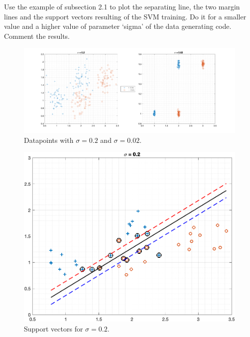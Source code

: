 \documentclass[11pt]{article}
\begin{document}
\newpage
\begin{tcolorbox}[colback=CrispBlue!5!white,colframe=CrispBlue!75!black,title=3.2 Graphical representation of an SVM.]
Use the example of subsection 2.1 to plot the separating line, the two margin lines and the support vectors resulting of the SVM training. Do it for a smaller value and a higher value of parameter `sigma' of the data generating code. Comment the results.
\end{tcolorbox}

\begin{figure}[ht]
    \centering
    \includegraphics[width=\textwidth]{sampleData.png}
    \vspace{-1em}\caption{Datapoints with \( \sigma = 0.2\) and \( \sigma = 0.02 \).}
    \label{fig:sampleData}
\end{figure}

\begin{figure}[ht]
    \centering
    \includegraphics[width=\textwidth]{SVM_sig0.2.png}
    \vspace{-1em}\caption{Support vectors for \( \sigma = 0.2\).}
    \label{fig:SVM-0.2}
\end{figure}
\end{document}
